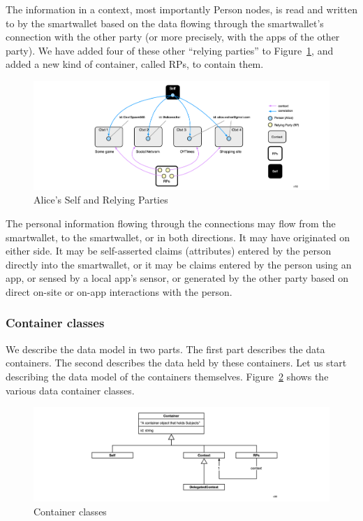 \documentclass[11pt, oneside]{article}   	%
\begin{document}
The information in a context, most importantly Person nodes, is read and written to by the smartwallet based on the data flowing through the smartwallet's connection with the other party (or more precisely, with the apps of the other party). We have added four of these other ``relying parties'' to Figure~\ref{fig:RPs-container}, and added a new kind of container, called RPs, to contain them. 

\begin{figure}[h!]
\includegraphics[width=\textwidth]{./images/example2.png}
\caption{Alice's Self and Relying Parties}
\label{fig:RPs-container}
\end{figure}

The personal information flowing through the connections may flow from the smartwallet, to the smartwallet, or in both directions. It may have originated on either side. It may be self-asserted claims (attributes) entered by the person directly into the smartwallet, or it may be claims entered by the person using an app, or sensed by a local app's sensor, or generated by the other party based on direct on-site or on-app interactions with the person.

\subsubsection{Container classes}

We describe the data model in two parts. The first part describes the data containers. The second describes the data held by these containers. Let us start describing the data model of the containers themselves. Figure~\ref{fig:containers} shows the various data container classes. 

\begin{figure}[h!]
\includegraphics[width=\textwidth]{./images/container-classes.png}
\caption{Container classes}
\label{fig:containers}
\end{figure} 
\end{document}
